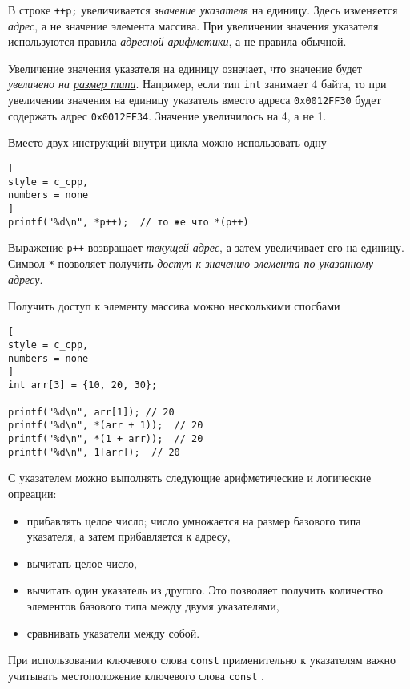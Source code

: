 \documentclass[%
	11pt,
	a4paper,
	utf8,
		]{article}
\begin{document}
В строке \verb*|++p;| увеличивается \emph{значение указателя} на единицу. Здесь изменяется \emph{адрес}, а не значение элемента массива. При увеличении значения указателя используются правила \emph{адресной арифметики}, а не правила обычной.

Увеличение значения указателя на единицу означает, что значение будет \emph{увеличено на \underline{размер типа}}. Например, если тип \verb*|int| занимает 4 байта, то при увеличении значения на единицу указатель вместо адреса \verb|0x0012FF30| будет содержать адрес \verb*|0x0012FF34|. Значение увеличилось на 4, а не 1.

Вместо двух инструкций внутри цикла можно использовать одну
\begin{lstlisting}[
style = c_cpp,
numbers = none
]
printf("%d\n", *p++);  // то же что *(p++)
\end{lstlisting}

Выражение \verb|p++| возвращает \emph{текущей адрес}, а затем увеличивает его на единицу. Символ \verb*|*| позволяет получить \emph{доступ к значению элемента по указанному адресу}.

Получить доступ к элементу массива можно несколькими спосбами
\begin{lstlisting}[
style = c_cpp,
numbers = none	
]
int arr[3] = {10, 20, 30};

printf("%d\n", arr[1]); // 20
printf("%d\n", *(arr + 1));  // 20
printf("%d\n", *(1 + arr));  // 20
printf("%d\n", 1[arr]);  // 20
\end{lstlisting}

С указателем можно выполнять следующие арифметические и логические опреации:
\begin{itemize}
	\item прибавлять целое число; число умножается на размер базового типа указателя, а затем прибавляется к адресу,
	
	\item вычитать целое число,
	
	\item вычитать один указатель из другого. Это позволяет получить количество элементов базового типа между двумя указателями,
	
	\item сравнивать указатели между собой.
\end{itemize}

При использовании ключевого слова \verb*|const| применительно к указателям важно учитывать местоположение ключевого слова \verb|const| \cite[]{prokhorenok-prog-c:2020}. 
\end{document}
